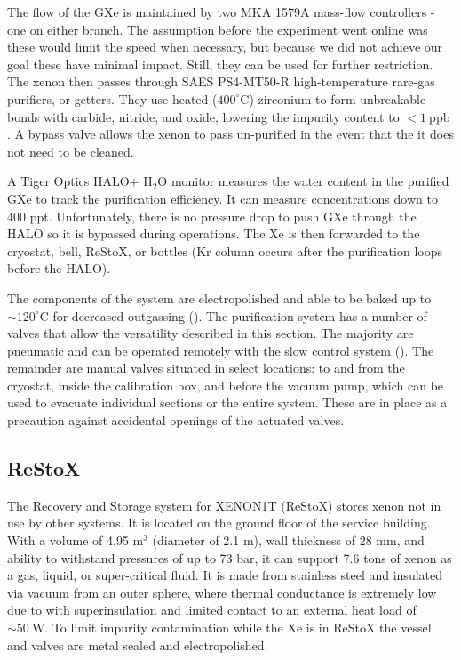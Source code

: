 The flow of the GXe is maintained by two MKA 1579A mass-flow controllers - one on either branch.  The assumption before the experiment
went
online was these would limit the speed when necessary, but because we did not achieve our goal these have minimal impact.  Still, they can
be used for further restriction.  The xenon then passes through SAES PS4-MT50-R high-temperature rare-gas purifiers, or getters.  They
use heated ($400^{\circ}\mathrm{C}$) zirconium to form unbreakable bonds with carbide, nitride, and oxide, lowering the impurity content
to $< 1\ \mathrm{ppb}$ .  A bypass valve allows the xenon to pass un-purified in the event that the it does not
need to be cleaned.

A Tiger Optics HALO+ H$_2$O monitor measures the water content in the purified GXe to track the purification efficiency.  It can measure
concentrations down to 400 ppt.  Unfortunately, there is no pressure drop to push GXe through the HALO so it is bypassed during
operations.  The Xe is then forwarded to the cryostat, bell, ReStoX, or
bottles (Kr column occurs after the purification loops before the HALO).

The components of the system are electropolished and able to be baked up to ${\sim} 120^{\circ}\mathrm{C}$ for decreased outgassing
().  The purification system has a number of valves that allow the versatility described in this section.  The majority are
pneumatic and can
be operated remotely with the slow control system ().  The remainder are manual valves
situated in select locations: to and from the cryostat,
inside the calibration box, and before the vacuum pump, which can be used to evacuate individual sections or the entire system.  These are
in place as a precaution against accidental openings of the actuated valves.


\subsection{ReStoX}
\label{subsec:xenon1t_restox}
The Recovery and Storage system for XENON1T (ReStoX) stores xenon not in use by other systems.  It is located on the ground floor of the
service building.  With a volume of 4.95 m$^{3}$
(diameter of 2.1 m), wall thickness of 28 mm, and ability to withstand pressures of up to 73 bar, it can support 7.6 tons of
xenon
as a gas, liquid, or super-critical fluid.  It is made from stainless steel and insulated via vacuum from an outer sphere, where
thermal conductance is extremely low due to with superinsulation and limited contact to an external heat load of
${\sim}50\ \mathrm{W}$.  To limit
impurity contamination while the Xe is in ReStoX the vessel and valves are metal sealed and electropolished.

